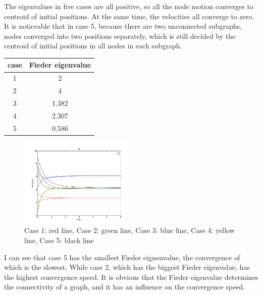 \documentclass[12pt]{article}
\begin{document}
The eigenvalues in five cases are all positive, so all the node motion converges to centroid of initial positions. At the same time, the velocities all converge to zero. It is noticeable that in case 5, because there are two unconnected subgraphs, nodes converged into two positions separately, which is still decided by the centroid of initial positions in all nodes in each subgraph. 

\begin{tabular}{|c|c|}
\hline
case & Fieder eigenvalue \\\hline
1 & 2 \\\hline
2 & 4 \\\hline
3 & 1.382 \\\hline
4 & 2.307 \\\hline
5 & 0.586 \\\hline
\end{tabular}

\begin{figure}[htbp]
\centering
\includegraphics[width=0.5\textwidth]{./compare}
\caption{Case 1: red line, Case 2: green line, Case 3: blue line, Case 4: yellow line, Case 5: black line}
\label{fig:compare}
\end{figure}

I can see that case 5 has the smallest Fieder eignenvalue, the convergence of which is the slowest. While case 2, which has the biggest Fieder eigenvalue, has the highest convergence speed. It is obvious that the Fieder eigenvalue determines the connectivity of a graph, and it has an influence on the convergence speed.
\end{document}

